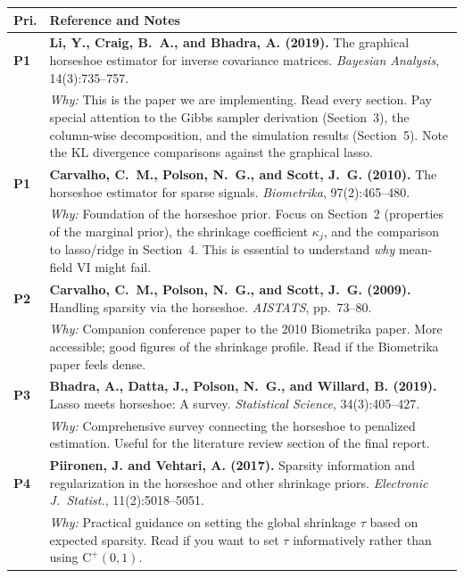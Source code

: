 \documentclass[11pt,a4paper]{article}
\begin{document}
\begin{longtable}{@{}p{}p{}@{}}
\toprule
\textbf{Pri.} & \textbf{Reference and Notes} \\
\midrule
\endhead

\textcolor{P1}{\textbf{P1}} &
\textbf{Li, Y., Craig, B.~A., and Bhadra, A. (2019).} The graphical horseshoe estimator for inverse covariance matrices. \textit{Bayesian Analysis}, 14(3):735--757. \\
& \textit{Why:} This is the paper we are implementing. Read every section. Pay special attention to the Gibbs sampler derivation (Section~3), the column-wise decomposition, and the simulation results (Section~5). Note the KL divergence comparisons against the graphical lasso. \\[0.8em]

\textcolor{P1}{\textbf{P1}} &
\textbf{Carvalho, C.~M., Polson, N.~G., and Scott, J.~G. (2010).} The horseshoe estimator for sparse signals. \textit{Biometrika}, 97(2):465--480. \\
& \textit{Why:} Foundation of the horseshoe prior. Focus on Section~2 (properties of the marginal prior), the shrinkage coefficient $\kappa_j$, and the comparison to lasso/ridge in Section~4. This is essential to understand \textit{why} mean-field VI might fail. \\[0.8em]

\textcolor{P2}{\textbf{P2}} &
\textbf{Carvalho, C.~M., Polson, N.~G., and Scott, J.~G. (2009).} Handling sparsity via the horseshoe. \textit{AISTATS}, pp.~73--80. \\
& \textit{Why:} Companion conference paper to the 2010 Biometrika paper. More accessible; good figures of the shrinkage profile. Read if the Biometrika paper feels dense. \\[0.8em]

\textcolor{P3}{\textbf{P3}} &
\textbf{Bhadra, A., Datta, J., Polson, N.~G., and Willard, B. (2019).} Lasso meets horseshoe: A survey. \textit{Statistical Science}, 34(3):405--427. \\
& \textit{Why:} Comprehensive survey connecting the horseshoe to penalized estimation. Useful for the literature review section of the final report. \\[0.8em]

\textcolor{P4}{\textbf{P4}} &
\textbf{Piironen, J. and Vehtari, A. (2017).} Sparsity information and regularization in the horseshoe and other shrinkage priors. \textit{Electronic J.\ Statist.}, 11(2):5018--5051. \\
& \textit{Why:} Practical guidance on setting the global shrinkage $\tau$ based on expected sparsity. Read if you want to set $\tau$ informatively rather than using $\mathrm{C}^+(0,1)$. \\

\bottomrule
\end{longtable}
\end{document}
